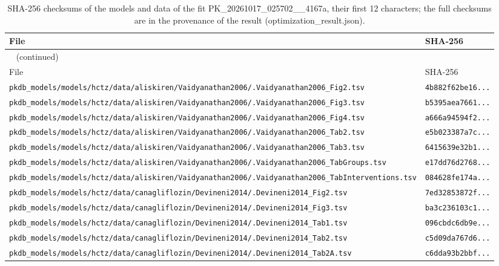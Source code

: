 \documentclass{article}
\begin{document}
\begin{longtable}{ll}
\caption{SHA-256 checksums of the models and data of the fit PK\_20261017\_025702\_\_4167a, their first 12 characters; the full checksums are in the provenance of the result (optimization\_result.json).}\label{tab:checksums:PK_20261017_025702__4167a} \\
\toprule
File & SHA-256 \\
\midrule
\endfirsthead
\multicolumn{2}{l}{\small\tablename~\thetable{} (continued)} \\
\toprule
File & SHA-256 \\
\midrule
\endhead
\bottomrule
\endlastfoot
\texttt{pkdb\_models/models/hctz/data/aliskiren/Vaidyanathan2006/.Vaidyanathan2006\_Fig2.tsv} & \texttt{4b882f62be16...} \\
\texttt{pkdb\_models/models/hctz/data/aliskiren/Vaidyanathan2006/.Vaidyanathan2006\_Fig3.tsv} & \texttt{b5395aea7661...} \\
\texttt{pkdb\_models/models/hctz/data/aliskiren/Vaidyanathan2006/.Vaidyanathan2006\_Fig4.tsv} & \texttt{a666a94594f2...} \\
\texttt{pkdb\_models/models/hctz/data/aliskiren/Vaidyanathan2006/.Vaidyanathan2006\_Tab2.tsv} & \texttt{e5b023387a7c...} \\
\texttt{pkdb\_models/models/hctz/data/aliskiren/Vaidyanathan2006/.Vaidyanathan2006\_Tab3.tsv} & \texttt{6415639e32b1...} \\
\texttt{pkdb\_models/models/hctz/data/aliskiren/Vaidyanathan2006/.Vaidyanathan2006\_TabGroups.tsv} & \texttt{e17dd76d2768...} \\
\texttt{pkdb\_models/models/hctz/data/aliskiren/Vaidyanathan2006/.Vaidyanathan2006\_TabInterventions.tsv} & \texttt{084628fe174a...} \\
\texttt{pkdb\_models/models/hctz/data/canagliflozin/Devineni2014/.Devineni2014\_Fig2.tsv} & \texttt{7ed32853872f...} \\
\texttt{pkdb\_models/models/hctz/data/canagliflozin/Devineni2014/.Devineni2014\_Fig3.tsv} & \texttt{ba3c236103c1...} \\
\texttt{pkdb\_models/models/hctz/data/canagliflozin/Devineni2014/.Devineni2014\_Tab1.tsv} & \texttt{096cbdc6db9e...} \\
\texttt{pkdb\_models/models/hctz/data/canagliflozin/Devineni2014/.Devineni2014\_Tab2.tsv} & \texttt{c5d09da767d6...} \\
\texttt{pkdb\_models/models/hctz/data/canagliflozin/Devineni2014/.Devineni2014\_Tab2A.tsv} & \texttt{c6dda93b2bbf...} \\

\end{longtable}
\end{document}
